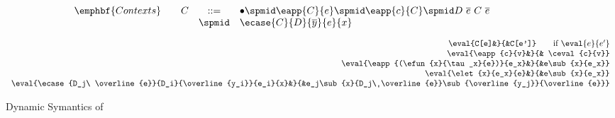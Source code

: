 \begin{figure}
$$
\begin{array}{rrcl}
\emphbf{Contexts} \quad 
  & C
  & ::= 
  &   	 \bullet 
  \spmid \eapp{C}{e} 
  \spmid \eapp{c}{C} 
  \spmid D\ \overline{e}\ C\ \overline{e}\\
  &&\spmid &
  \ecase{C}{D}{\overline{y}}{e}{x}
  \\[0.05in] 
\end{array}
$$
%
\hfill\mbox{}
$$
\begin{array}{rcl}
\eval{C[e]&}{&C[e']} \qquad \text{if}\ \eval{e}{e'} \\
	\eval{\eapp{c}{v}&}{& \ceval{c}{v}}\\
\eval{\eapp{(\efun{x}{\tau_x}{e})}{e_x}&}{&e\sub{x}{e_x}}\\
	\eval{\elet{x}{e_x}{e}&}{&e\sub{x}{e_x}} \\
	\eval{\ecase{D_j\ \overline{e}}{D_i}{\overline{y_i}}{e_i}{x}&}
	{&e_j\sub{x}{D_j\ \overline{e}}\sub{\overline{y_j}}{\overline{e}}} \\
\end{array}
$$
\label{fig:operational}
\caption{Dynamic Symantics of \declang}
\end{figure}
